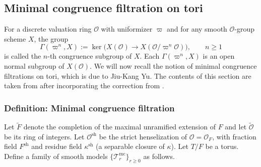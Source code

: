 \documentclass[american]{article}
\numberwithin{equation}{section}
\numberwithin{figure}{section}
\theoremstyle{plain}
\theoremstyle{definition}
\theoremstyle{remark}
\DeclareMathOperator{\sh}{sh}
\newcommand{\cO}{\mathcal{O}}
\begin{document}
\subsection{Minimal congruence filtration on tori}
\label{sub:min-congruence}
For a discrete valuation ring \(\mathcal{O}\) with uniformizer \(\varpi\) and for  any smooth $\cO$-group scheme $X$, the group
\[
   \Gamma(\varpi^n,X) :=\ker\!\bigl(X(\cO)\longrightarrow X(\cO/\varpi^n\cO)\bigr),\qquad n \geq 1
\]
is called the \(n\)-th congruence subgroup of \(X\).  Each $\Gamma(\varpi^n,X)$ is an open normal subgroup of $X(\cO)$.
We will now recall the notion of minimal congruence filtrations on tori, which is due to Jiu-Kang Yu. 
The contents of this section are taken from \cite{yu2002smooth} after incorporating the correction from \cite{kaletha-prasad2024errata}.

\subsubsection{Definition: Minimal congruence filtration}\label{subsub:mincongdef}
Let $\widetilde{F}$ denote the completion of the maximal unramified extension of $F$ and let $\widetilde{\mathcal{O}}$  be its ring of integers.
Let \(\mathcal{O}^{\sh}\) be the strict henselization of \(\mathcal{O}=\mathcal O_F\), with fraction field \(F^{\mathrm{sh}}\) and residue field \(\kappa^{\mathrm{sh}}\) (a separable closure of \(\kappa\)). Let $T/F$ be a torus. Define a family of smooth models $\{\mathscr{T}^{\mathrm{mc}}_r\}_{r\geq 0}$ as follows.
\end{document}
